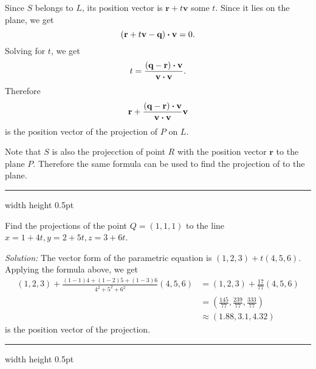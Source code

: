 Since $S$ belongs to $L$,
its position vector is  $\textbf{r}+t\textbf{v}$ some $t$.
Since it lies on the plane, we get
\[(\textbf{r}+t\textbf{v}-\textbf{q}) \bm{\cdot} \textbf{v}=0.\]
Solving for $t$, we get
\[t=\frac{(\textbf{q}-\textbf{r}) \bm{\cdot} \textbf{v}}{\textbf{v} \bm{\cdot} \textbf{v}}.\]
Therefore 
\[\textbf{r}+\frac{(\textbf{q}-\textbf{r}) \bm{\cdot} \textbf{v}}{\textbf{v} \bm{\cdot} \textbf{v}}\textbf{v}\]
is the position vector of the projection of $P$ on $L$.

Note that $S$ is also the projecction of point $R$ with the position vector $\textbf{r}$ to the plane $P$.
Therefore the same formula can be used to find the projection of to the plane.

\hrule width \textwidth height 0.5pt
\smallskip
\begin{exmp}
\label{exmp:projection}
 Find the projections of the point $Q = (1,1,1)$ to the line $x=1+4t, y=2+5t, z=3+6t$.
 \smallskip
 \par\noindent\emph{Solution:} The vector form of the parametric equation is $(1,2,3)+t(4,5,6)$.
 Applying the formula above, we get
\begin{align*}
(1,2,3)+\frac{(1-1)4+(1-2)5+(1-3)6}{4^2+5^2+6^2}(4,5,6)
&=(1,2,3)+\frac{17}{77}(4,5,6)
\\
&=(\tfrac{145}{77},\tfrac{239}{77},\tfrac{333}{77})
\\
&\approx(1.88,3.1,4.32)
\end{align*}
is the position vector of the projection.
\end{exmp}
\hrule width \textwidth height 0.5pt

